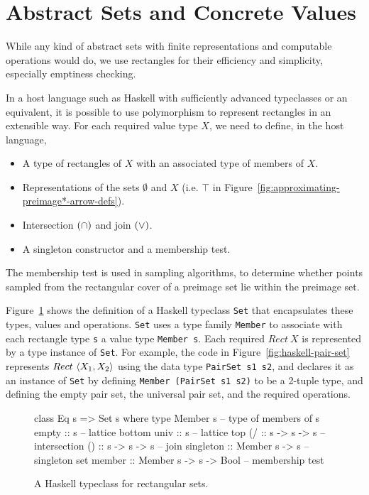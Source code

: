 \section{Abstract Sets and Concrete Values}

While any kind of abstract sets with finite representations and computable operations would do, we use rectangles for their efficiency and simplicity, especially emptiness checking.

In a host language such as Haskell with sufficiently advanced typeclasses or an equivalent, it is possible to use polymorphism to represent rectangles in an extensible way.
For each required value type $X$, we need to define, in the host language,
\begin{itemize}
	\item A type of rectangles of $X$ with an associated type of members of $X$.
	\item Representations of the sets $\emptyset$ and $X$ (i.e. $\top$ in Figure~\ref{fig:approximating-preimage*-arrow-defs}).
	\item Intersection $(\cap)$ and join $(\vee)$.
	\item A singleton constructor and a membership test.
\end{itemize}
The membership test is used in sampling algorithms, to determine whether points sampled from the rectangular cover of a preimage set lie within the preimage set.

Figure~\ref{fig:haskell-sets} shows the definition of a Haskell typeclass \texttt{Set} that encapsulates these types, values and operations.
\texttt{Set} uses a type family \texttt{Member} to associate with each rectangle type \texttt{s} a value type \texttt{Member~s}.
Each required $Rect~X$ is represented by a type instance of \texttt{Set}.
For example, the code in Figure~\ref{fig:haskell-pair-set} represents $Rect~\langle{X_1,X_2}\rangle$ using the data type \texttt{PairSet~s1~s2}, and declares it as an instance of \texttt{Set} by defining \texttt{Member~(PairSet~s1~s2)} to be a 2-tuple type, and defining the empty pair set, the universal pair set, and the required operations.

\begin{figure}[tb!]\centering
\begin{varwidth}{5.25in}
\begin{haskellcode}
class Eq s => Set s where
  type Member s                      -- type of members of s
  empty :: s                         -- lattice bottom
  univ  :: s                         -- lattice top
  (/\) :: s -> s -> s                -- intersection
  (\/) :: s -> s -> s                -- join
  singleton :: Member s -> s         -- singleton set
  member :: Member s -> s -> Bool    -- membership test
\end{haskellcode}
\end{varwidth}
\bottomhrule
\caption[Haskell typeclass for rectangular sets]{A Haskell typeclass for rectangular sets.}
\label{fig:haskell-sets}
\end{figure}

